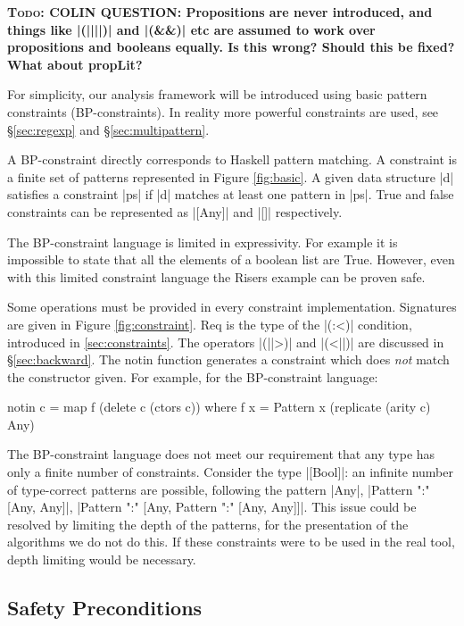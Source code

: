 \documentclass[preprint]{sigplanconf}
\newcommand{\C}[1]{\textsf{#1}}
\newcommand{\todo}[1]{\textbf{\textsc{Todo:} #1}}
\begin{document}
\todo{COLIN QUESTION: Propositions are never introduced, and things like |(||||)| and |(&&)| etc are assumed to work over propositions and booleans equally. Is this wrong? Should this be fixed? What about \C{propLit}?}

For simplicity, our analysis framework will be introduced using basic pattern constraints (BP-constraints). In  reality more powerful constraints are used, see \S\ref{sec:regexp} and \S\ref{sec:multipattern}.

A BP-constraint directly corresponds to Haskell pattern matching. A constraint is a finite set of patterns represented in Figure \ref{fig:basic}. A given data structure |d| satisfies a constraint |ps| if |d| matches at least one pattern in |ps|. True and false constraints can be represented as |[Any]| and |[]| respectively.

The BP-constraint language is limited in expressivity. For example it is impossible to state that all the elements of a boolean list are True. However, even with this limited constraint language the Risers example can be proven safe.

Some operations must be provided in every constraint implementation. Signatures are given in Figure \ref{fig:constraint}. \C{Req} is the type of the |(:<)| condition, introduced in \ref{sec:constraints}. The operators |(||>)| and |(<||)| are discussed in \S\ref{sec:backward}. The \C{notin} function generates a constraint which does \textit{not} match the constructor given. For example, for the BP-constraint language:

\begin{code}
notin c = map f (delete c (ctors c))
   where f x = Pattern x (replicate (arity c) Any)
\end{code}

The BP-constraint language does not meet our requirement that any type has only a finite number of constraints. Consider the type |[Bool]|: an infinite number of type-correct patterns are possible, following the pattern |Any|, |Pattern ":" [Any, Any]|, |Pattern ":" [Any, Pattern ":" [Any, Any]]|. This issue could be resolved by limiting the depth of the patterns, for the presentation of the algorithms we do not do this. If these constraints were to be used in the real tool, depth limiting would be necessary.

\subsection{Safety Preconditions}
\label{sec:precond}
\end{document}
